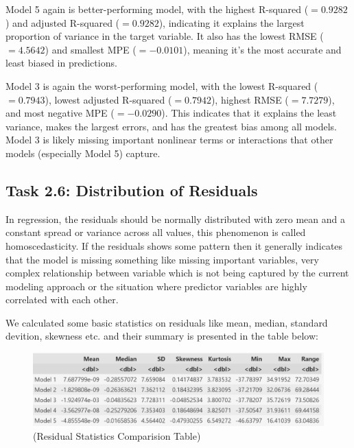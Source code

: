 \documentclass[12pt,a4paper]{article}
\begin{document}
Model 5 again is better-performing model, 
with the highest R-squared ($= 0.9282$) and adjusted R-squared ($=0.9282$), indicating it explains the largest 
proportion of variance in the target variable. 
It also has the lowest RMSE ($=4.5642$) and smallest MPE ($=-0.0101$), 
meaning it's the most accurate and least biased in predictions.

Model 3 is again the worst-performing model, with the lowest R-squared ($=0.7943$), 
lowest adjusted R-squared ($=0.7942$), highest RMSE ($=7.7279$), and most negative MPE ($=-0.0290$). 
This indicates that it explains the least variance, makes the largest errors, 
and has the greatest bias among all models. Model 3 is likely missing important 
nonlinear terms or interactions that other models (especially Model 5) capture.

\subsection*{Task 2.6: Distribution of Residuals}


In regression, the
residuals should be normally distributed with 
zero mean and a constant spread or variance 
across all values, this phenomenon is called 
homoscedasticity. If the residuals shows some
pattern then it generally indicates that the model 
is missing something like missing important 
variables, very complex relationship between 
variable which is not being captured by the current
modeling approach or the situation where 
predictor variables are highly correlated with each
other.

We calculated some basic statistics on residuals
like mean, median, standard devition, skewness etc. and
their summary is presented in the table below: 

\begin{figure}[H]
  \centering
  \includegraphics[width=\textwidth]{y6.png}
  \caption{(Residual Statistics Comparision Table)}
  \label{fig:Comparision Table}
\end{figure}
\end{document}
